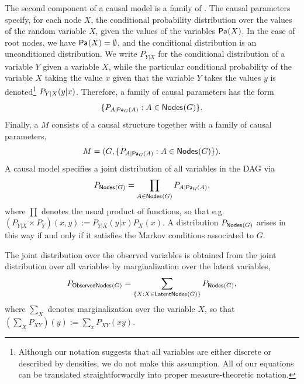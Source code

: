 \documentclass[aps,english,superscriptaddress,onecolumn,twoside,longbibliography,pra,floatfix,fleqn,nofootinbib]{revtex4-1}%
\newcommand*{\tblue}[1]{{\color{MidnightBlue}{\textbf{#1}}}}
\theoremstyle{definition}
\newcommand{\p}[2][]{{P_{#1}}\parenths{#2}}
\newcommand{\pfunc}[1]{P_{#1}}
\newcommand{\Pa}[2][]{{\mathsf{Pa}_{#1}}\parenths{#2}}
\newcommand{\SmallNamedFunction}[3][]{\operatorname{\mathsf{#2}}_{#1}\parenths{#3}}
\newcommand{\nodes}[1]{\SmallNamedFunction{Nodes}{#1}}
\newcommand{\obsnodes}[1]{\SmallNamedFunction{ObservedNodes}{#1}}
\newcommand{\latnodes}[1]{\SmallNamedFunction{LatentNodes}{#1}}
\DeclarePairedDelimiter{\parenths}{\lparen}{\rparen}
\begin{document}
 The second component of a causal model is a family of \tblue{causal parameters}.
The causal parameters specify, for each node $X$, the conditional probability distribution over the values of the random variable $X$, given the values of the variables $\Pa{X}$.  In the case of root nodes, we have $\Pa{X} = \emptyset$, and the conditional distribution is an unconditioned distribution.
We write $\pfunc{Y|X}$ for the conditional distribution of a variable $Y$ given a variable $X$, while the particular conditional probability of the variable $X$ taking the value $x$ given that the variable $Y$ takes the values $y$ is denoted\footnote{Although our notation suggests that all variables are either discrete or described by densities, we do not make this assumption.  All of our equations can be translated straightforwardly into proper measure-theoretic notation.} $\p[Y|X]{y|x}$.    Therefore, a family of causal parameters has the form
\begin{align}
 \{ \pfunc{A|\Pa[G]{A}} : A \in \nodes{G} \}.
\end{align}
Finally, a \tblue{causal model} $M$ consists of a causal structure together with a family of causal parameters,
\[
	M = ( G,   \{ \pfunc{A|\Pa[G]{A}} : A \in \nodes{G} \}).
\]
A causal model specifies a joint distribution of all variables in the DAG via
\begin{align}\label{Markov}
P_{\nodes{G}} = \prod_{A\in \nodes{G}} \pfunc{A|\Pa[G]{A}},
\end{align}
where $\prod$ denotes the usual product of functions, so that e.g.~$(P_{Y|X} \times P_Y)(x,y) := P_{Y|X}(y|x) P_X(x)$. A distribution $P_{\nodes{G}}$ arises in this way if and only if it satisfies the Markov conditions associated to $G$.

The joint distribution over the observed variables is obtained from the joint distribution over all variables by marginalization over the latent variables,
\begin{align}\label{MarkovObserved}
P_{\obsnodes{G}} =  \sum_{\{X :X \in\latnodes{G}\}} P_{\nodes{G}},
\end{align}
where $\sum_X$ denotes marginalization over the variable $X$, so that $(\sum_X P_{XY})(y):= \sum_x P_{XY}(xy)$.

\end{document}
